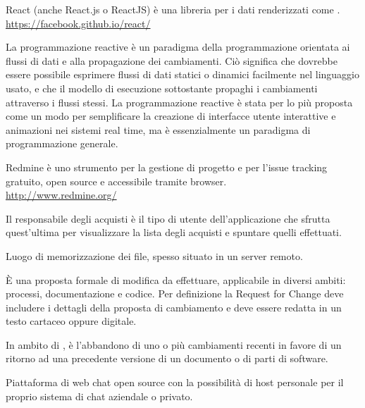 React (anche React.js o ReactJS) è una libreria   per i dati renderizzati come .\\
\url{https://facebook.github.io/react/}

La programmazione reactive è un paradigma della programmazione orientata ai flussi di dati e alla propagazione dei cambiamenti. Ciò significa che dovrebbe essere possibile esprimere flussi di dati statici o dinamici facilmente nel linguaggio usato, e che il modello di esecuzione sottostante propaghi i cambiamenti attraverso i flussi stessi. La programmazione reactive è stata per lo più proposta come un modo per semplificare la creazione di interfacce utente interattive e animazioni nei sistemi real time, ma è essenzialmente un paradigma di programmazione generale.

Redmine è uno strumento per la gestione di progetto e per l'issue tracking gratuito, open source e accessibile tramite browser.\\ 
\url{http://www.redmine.org/}

Il responsabile degli acquisti è il tipo di utente dell’applicazione che sfrutta quest’ultima per visualizzare la lista degli acquisti e spuntare quelli effettuati.

Luogo di memorizzazione dei file, spesso situato in un server remoto.

È una proposta formale di modifica da effettuare, applicabile in diversi ambiti: processi, documentazione e codice. Per definizione la Request for Change deve includere i dettagli della proposta di cambiamento e deve essere redatta in un testo cartaceo oppure digitale. 

In ambito di , è l'abbandono di uno o più cambiamenti recenti in favore di un ritorno ad una precedente versione di un documento o di parti di software.

Piattaforma di web chat open source con la possibilità di host personale per il proprio sistema di chat aziendale o privato. 
\clearpage
